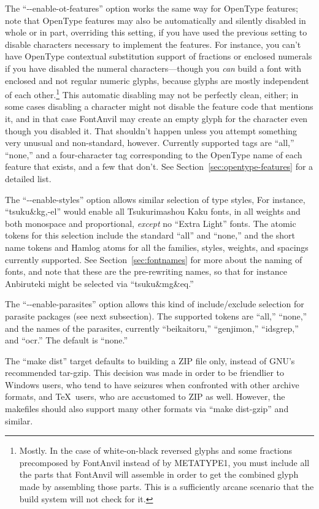 \documentclass[14pt]{extarticle}
\begin{document}
The ``-{}-enable-ot-features'' option works the same way for OpenType
features; note that OpenType features may also be automatically and silently
disabled in whole or in part, overriding this setting, if you have used the
previous setting to disable characters necessary to implement the features. 
For instance, you can't have OpenType contextual substitution support of
fractions or enclosed numerals if you have disabled the numeral
characters---though you \emph{can} build a font with enclosed and not
regular numeric glyphs, because glyphs are mostly independent of each
other.\footnote{Mostly.  In the case of white-on-black reversed glyphs and
some fractions precomposed by FontAnvil instead of by METATYPE1, you
must include all the parts that FontAnvil will assemble in order to get the
combined glyph made by assembling those parts.  This is a sufficiently
arcane scenario that the build system will not check for it.}
This automatic disabling may not be perfectly clean, either; in some cases
disabling a character might not disable the feature code that mentions it,
and in that case FontAnvil may create an empty glyph for the character even
though you disabled it.  That shouldn't happen unless you attempt something
very unusual and non-standard, however. Currently supported tags are
``all,'' ``none,'' and a four-character tag corresponding to the OpenType
name of each feature that exists, and a few that don't.  See
Section~\ref{sec:opentype-features} for a detailed list.

The ``-{}-enable-styles'' option allows similar selection of type styles,
For instance, ``tsuku\&kg,-el'' would enable all
Tsukurimashou Kaku fonts, in all weights and both monospace and
proportional, \emph{except} no ``Extra Light'' fonts.  The atomic tokens for
this selection include the standard ``all'' and ``none,'' and the short
name tokens and Hamlog atoms for all the families, styles, weights, and
spacings currently supported.  See Section~\ref{sec:fontnames} for more
about the naming of fonts, and note that these are the pre-rewriting names,
so that for instance Anbiruteki might be selected via ``tsuku\&mg\&eq.''

The ``-{}-enable-parasites'' option allows this kind of include/exclude
selection for parasite packages (see next subsection).  The supported tokens
are ``all,'' ``none,'' and the names of the parasites, currently
``beikaitoru,'' ``genjimon,'' ``idsgrep,'' and ``ocr.''
The default is ``none.''

The ``make dist'' target defaults to building a ZIP file only, instead of
GNU's recommended tar-gzip.  This decision was made in order to be
friendlier to Windows users, who tend to have seizures when confronted with
other archive formats, and \TeX\ users, who are accustomed to ZIP as well. 
However, the makefiles should also support many other formats via ``make
dist-gzip'' and similar.
\end{document}
